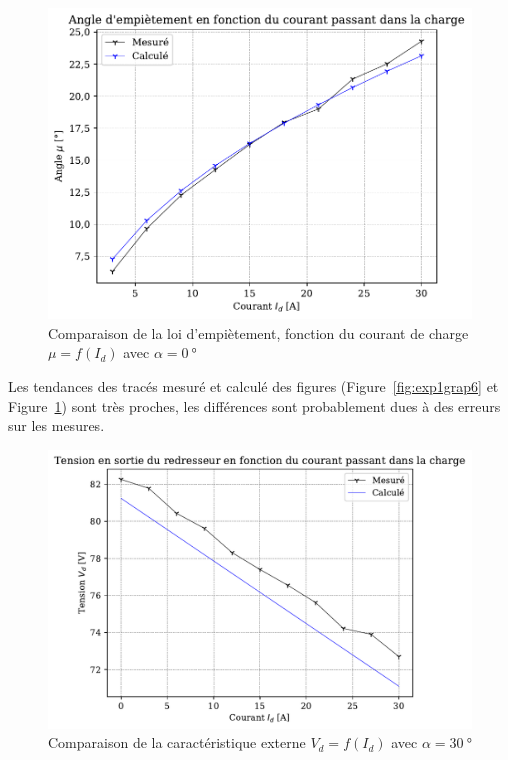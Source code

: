 \documentclass[a4paper, 11pt, openany, oneside, french]{article}
\begin{document}
\begin{figure}[!ht]
    \centering
    \includegraphics[width=0.8\linewidth]{exp1_graph8}
    \caption{Comparaison de la loi d'empiètement, fonction du courant de charge $\mu=f\left(I_d\right)$ avec $\alpha = \SI{0}{\degree}$}
    \label{fig:exp1grap8}
\end{figure}

Les tendances des tracés mesuré et calculé des figures (Figure~\ref{fig:exp1grap6} et Figure~\ref{fig:exp1grap8}) sont très proches, les différences sont probablement dues à des erreurs sur les mesures.

\begin{figure}[!ht]
    \centering
    \includegraphics[width=0.8\linewidth]{exp1_graph7}
    \caption{Comparaison de la caractéristique externe $V_d=f\left(I_d\right)$ avec $\alpha = \SI{30}{\degree}$}
    \label{fig:exp1grap7}
\end{figure}
\clearpage
\end{document}
